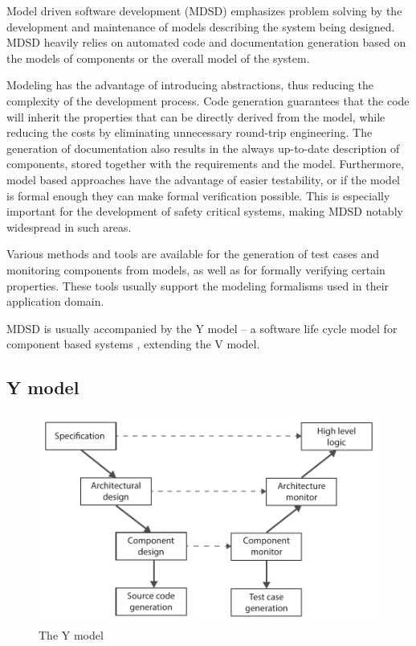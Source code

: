 Model driven software development (MDSD) emphasizes problem solving by the development and maintenance of models describing the system being designed. MDSD heavily relies on automated code and documentation generation based on the models of components or the overall model of the system. 

Modeling has the advantage of introducing abstractions, thus reducing the complexity of the development process. Code generation guarantees that the code will inherit the properties that can be directly derived from the model, while reducing the costs by eliminating unnecessary round-trip engineering. The generation of documentation also results in the always up-to-date description of components, stored together with the requirements and the model. Furthermore, model based approaches have the advantage of easier testability, or if the model is formal enough they can make formal verification possible. This is especially important for the development of safety critical systems, making MDSD notably widespread in such areas.

Various methods and tools are available for the generation of test cases and monitoring components from models, as well as for formally verifying certain properties. These tools usually support the modeling formalisms used in their application domain.

MDSD is usually accompanied by the Y model -- a software life cycle model for component based systems \citep{ymodel}, extending the V model.

\subsection{Y model} %

\begin{figure}[h]
	\centering
	\includegraphics[width=0.8\linewidth]{include/figures/chapter_1/YModel}
	\caption{The Y model}
	\label{fig:intro:vmodel}
\end{figure}

